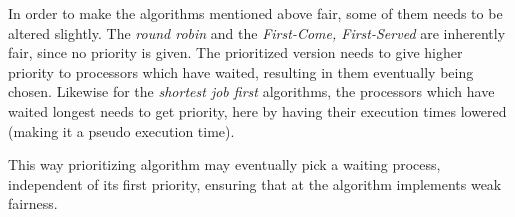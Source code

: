 In order to make the algorithms mentioned above fair, some of them needs to be altered slightly. The \textit{round robin} and the \textit{First-Come, First-Served} are inherently fair, since no priority is given. The prioritized version needs to give higher priority to processors which have waited, resulting in them eventually being chosen. Likewise for the \textit{shortest job first} algorithms, the processors which have waited longest needs to get priority, here by having their execution times lowered (making it a pseudo execution time). 

This way prioritizing algorithm may eventually pick a waiting process, independent of its first priority, ensuring that at the algorithm implements weak fairness.